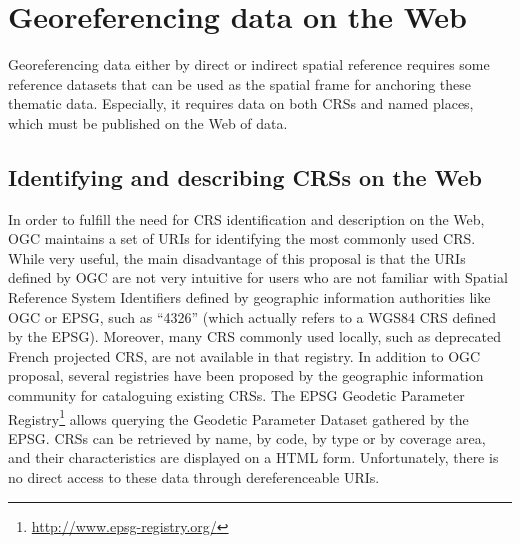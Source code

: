 \section{Georeferencing data on the Web}
\label{sec:georef}
Georeferencing data either by direct or indirect spatial reference requires some reference datasets that can be used as the spatial frame for anchoring these thematic data. Especially, it requires data on both CRSs and named places, which must be published on the Web of data.

\subsection{Identifying and describing CRSs on the Web}
In order to fulfill the need for CRS identification and description on the Web, OGC maintains a set of URIs for identifying the most commonly used CRS. While very useful, the main disadvantage of this proposal is that the URIs defined by OGC are not very intuitive for users who are not familiar with Spatial Reference System Identifiers defined by geographic information authorities like OGC or EPSG, such as ``4326'' (which actually refers to a WGS84 CRS defined by the EPSG). Moreover, many CRS commonly used locally, such as deprecated French projected CRS, are not available in that registry. In addition to OGC proposal, several registries have been proposed by the geographic information community for cataloguing existing CRSs.
The EPSG Geodetic Parameter Registry\footnote{\url{http://www.epsg-registry.org/}} allows querying the Geodetic Parameter Dataset gathered by the EPSG. CRSs can be retrieved by name, by code, by type or by coverage area, and their characteristics are displayed on a HTML form. Unfortunately, there is no direct access to these data through dereferenceable URIs.

